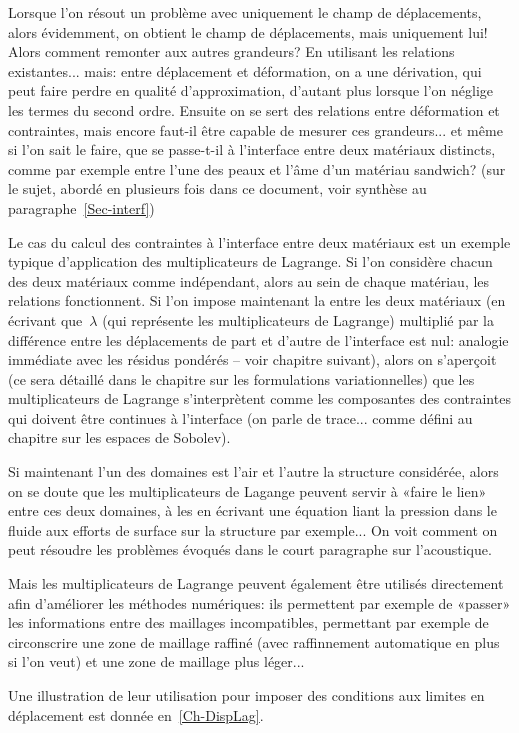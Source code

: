 Lorsque l'on résout un problème avec uniquement le champ de déplacements,
alors évidemment, on obtient le champ de déplacements, mais uniquement lui!
Alors comment remonter aux autres grandeurs? En utilisant les relations
existantes... mais: entre déplacement et déformation, on a une dérivation,
qui peut faire perdre en qualité d'approximation, d'autant plus lorsque l'on
néglige les termes du second ordre.
Ensuite on se sert des relations entre déformation et contraintes, mais encore
faut-il être capable de mesurer ces grandeurs... et même si l'on sait le faire,
que se passe-t-il à l'interface entre deux matériaux distincts, comme par exemple
entre l'une des peaux et l'âme d'un matériau sandwich? (sur le sujet, abordé en
plusieurs fois dans ce document, voir synthèse au paragraphe~\ref{Sec-interf})

\medskip
Le cas du calcul des contraintes à l'interface entre deux matériaux est un exemple
typique d'application des multiplicateurs de Lagrange.
Si l'on considère chacun des deux matériaux comme indépendant, alors au sein
de chaque matériau, les relations fonctionnent.
Si l'on impose maintenant la  
entre les deux matériaux (en écrivant que~$\lambda$ (qui représente les multiplicateurs de Lagrange)
multiplié par la différence entre les déplacements de part et d'autre de l'interface est nul: analogie
immédiate avec les résidus pondérés -- voir chapitre suivant), 
alors on s'aperçoit (ce sera détaillé dans le chapitre sur les 
formulations variationnelles) que les multiplicateurs de Lagrange s'interprètent comme
les composantes des contraintes qui doivent être continues à l'interface (on parle
de trace... comme défini au chapitre sur les espaces de Sobolev).

\medskip
Si maintenant l'un des domaines est l'air et l'autre la structure considérée, alors
on se doute que les multiplicateurs de Lagange peuvent servir à «faire le lien» 
entre ces deux domaines, à les  en écrivant une équation
liant la pression dans le fluide aux efforts de surface sur la structure par exemple...
On voit comment on peut résoudre les problèmes évoqués dans le court paragraphe 
sur l'acoustique.

\medskip
Mais les multiplicateurs de Lagrange peuvent également être utilisés directement
afin d'améliorer les méthodes numériques: ils permettent par exemple de «passer»
les informations entre des maillages incompatibles, permettant par exemple de circonscrire
une zone de maillage raffiné (avec raffinnement automatique en plus si l'on veut) et une
zone de maillage plus léger...

Une illustration de leur utilisation pour imposer des conditions aux limites en déplacement
est donnée en~\ref{Ch-DispLag}.

\medskip
{}



